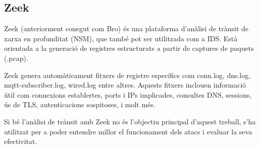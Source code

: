     \subsection{Zeek}
    \label{sec:Zeek}
    Zeek (anteriorment conegut com Bro) és una plataforma d’anàlisi de trànsit de xarxa en profunditat (NSM), que també pot ser utilitzada com a IDS. Està orientada a la generació de registres estructurats a partir de captures de paquets (.pcap). \cite{zeekexp}

    Zeek genera automàticament fitxers de registre específics com conn.log, dns.log, mqtt-subscriber.log, wired.log entre altres. Aquests fitxers inclouen informació útil com connexions establertes, ports i IPs implicades, consultes DNS, sessions, ús de TLS, autenticacions sospitoses, i molt més.

    Si bé l'anàlisi de trànsit amb Zeek no és l'objectiu principal d'aquest treball, s'ha utilitzat per a poder entendre millor el funcionament dels atacs i evaluar la seva efectivitat.